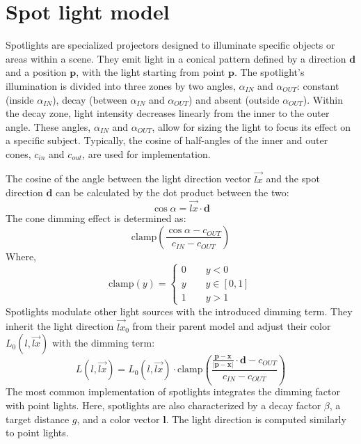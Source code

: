 \section{Spot light model}

Spotlights are specialized projectors designed to illuminate specific objects or areas within a scene.
They emit light in a conical pattern defined by a direction $\mathbf{d}$ and a position $\mathbf{p}$, with the light starting from point $\mathbf{p}$.
The spotlight's illumination is divided into three zones by two angles, $\alpha_{IN}$ and $\alpha_{OUT}$: constant (inside $\alpha_{IN}$), decay (between $\alpha_{IN}$ and $\alpha_{OUT}$) and absent (outside $\alpha_{OUT}$).
Within the decay zone, light intensity decreases linearly from the inner to the outer angle.
These angles, $\alpha_{IN}$ and $\alpha_{OUT}$, allow for sizing the light to focus its effect on a specific subject. 
Typically, the cosine of half-angles of the inner and outer cones, $c_{in}$ and $c_{out}$, are used for implementation.

The cosine of the angle between the light direction vector $\overrightarrow{lx}$ and the spot direction $\mathbf{d}$ can be calculated by the dot product between the two:
\[\cos\alpha=\overrightarrow{lx}\cdot\mathbf{d}\]
The cone dimming effect is determined as:
\[\text{clamp}\left(\dfrac{\cos\alpha-c_{OUT}}{c_{IN}-c_{OUT}}\right)\]
Where, 
\[\text{clamp}(y)=\begin{cases}
    0 \qquad y<0 \\
    y \qquad y\in[0,1] \\
    1 \qquad y>1
\end{cases}\]
Spotlights modulate other light sources with the introduced dimming term. 
They inherit the light direction $\overrightarrow{lx}_0$ from their parent model and adjust their color $L_0(l, \overrightarrow{lx})$ with the dimming term:
\[L(l,\overrightarrow{lx})=L_0(l,\overrightarrow{lx})\cdot\text{clamp}\left(\dfrac{\frac{\mathbf{p}-\mathbf{x}}{\left\lvert \mathbf{p}-\mathbf{x}\right\rvert}\cdot\mathbf{d}-c_{OUT}}{c_{IN}-c_{OUT}}\right)\]
The most common implementation of spotlights integrates the dimming factor with point lights. 
Here, spotlights are also characterized by a decay factor $\beta$, a target distance $g$, and a color vector $\mathbf{l}$. 
The light direction is computed similarly to point lights.